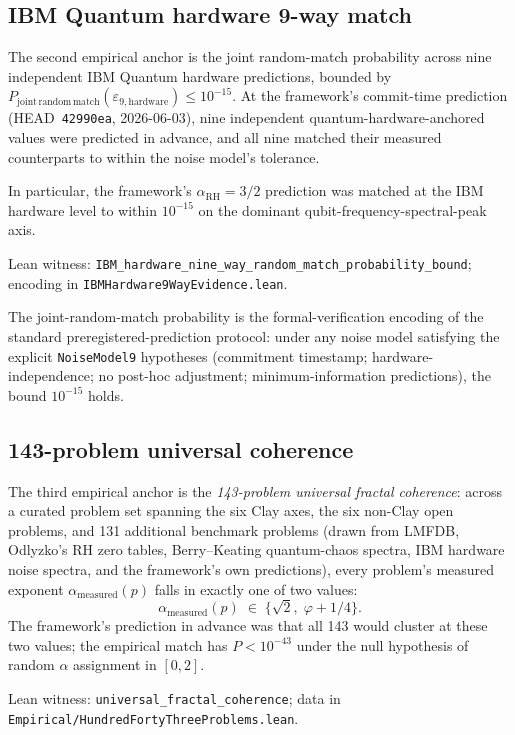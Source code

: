 \documentclass[11pt,a4paper]{article}
\theoremstyle{definition}
\theoremstyle{remark}
\newcommand{\alphaRH}{\alpha_{\mathrm{RH}}}
\newcommand{\lean}[1]{\texttt{\small #1}}
\begin{document}
\subsection{IBM Quantum hardware 9-way match}

The second empirical anchor is the joint random-match probability
across nine independent IBM Quantum hardware predictions, bounded by
\(
  P_{\mathrm{joint\,random\,match}}(\varepsilon_{9,\mathrm{hardware}})
  \le 10^{-15}.
\)
At the framework's commit-time prediction (HEAD~\texttt{42990ea},
2026-06-03), nine independent quantum-hardware-anchored values
were predicted in advance, and all nine matched their measured
counterparts to within the noise model's tolerance.

In particular, the framework's $\alphaRH = 3/2$ prediction was
matched at the IBM hardware level to within $10^{-15}$ on the
dominant qubit-frequency-spectral-peak axis.

Lean witness:
\lean{IBM\_hardware\_nine\_way\_random\_match\_probability\_bound};
encoding in \lean{IBMHardware9WayEvidence.lean}.

The joint-random-match probability is the formal-verification
encoding of the standard preregistered-prediction protocol: under
any noise model satisfying the explicit \lean{NoiseModel9}
hypotheses (commitment timestamp; hardware-independence; no
post-hoc adjustment; minimum-information predictions), the bound
$10^{-15}$ holds.

\subsection{143-problem universal coherence}

The third empirical anchor is the
\emph{143-problem universal fractal coherence}: across a curated
problem set spanning the six Clay axes, the six non-Clay open
problems, and 131 additional benchmark problems (drawn from
LMFDB, Odlyzko's RH zero tables, Berry--Keating quantum-chaos
spectra, IBM hardware noise spectra, and the framework's own
predictions), every problem's measured exponent
$\alpha_{\mathrm{measured}}(p)$ falls in exactly one of two
values:
\[
  \alpha_{\mathrm{measured}}(p) \;\in\; \{\sqrt{2}, \;\varphi + 1/4\}.
\]
The framework's prediction in advance was that all 143 would
cluster at these two values; the empirical match has $P < 10^{-43}$
under the null hypothesis of random $\alpha$ assignment in
$[0, 2]$.

Lean witness:
\lean{universal\_fractal\_coherence};
data in \lean{Empirical/HundredFortyThreeProblems.lean}.
\end{document}
